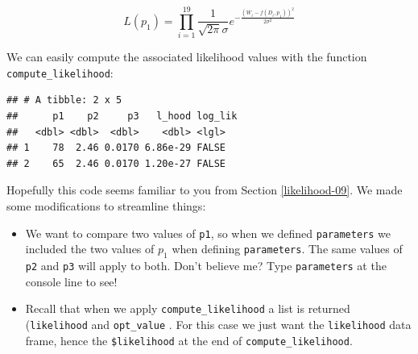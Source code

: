 \documentclass[
]{book}
\newenvironment{Shaded}{\begin{snugshade}}{\end{snugshade}}
\newcommand{\AttributeTok}[1]{\textcolor[rgb]{0.77,0.63,0.00}{#1}}
\newcommand{\CommentTok}[1]{\textcolor[rgb]{0.56,0.35,0.01}{\textit{#1}}}
\newcommand{\DecValTok}[1]{\textcolor[rgb]{0.00,0.00,0.81}{#1}}
\newcommand{\FloatTok}[1]{\textcolor[rgb]{0.00,0.00,0.81}{#1}}
\newcommand{\FunctionTok}[1]{\textcolor[rgb]{0.00,0.00,0.00}{#1}}
\newcommand{\NormalTok}[1]{#1}
\newcommand{\OtherTok}[1]{\textcolor[rgb]{0.56,0.35,0.01}{#1}}
\newcommand{\SpecialCharTok}[1]{\textcolor[rgb]{0.00,0.00,0.00}{#1}}
\providecommand{\tightlist}{%
  \setlength{\itemsep}{0pt}\setlength{\parskip}{0pt}}
\theoremstyle{definition}
\theoremstyle{definition}
\theoremstyle{definition}
\theoremstyle{remark}
\begin{document}
\begin{equation}
L(p_{1}) = \prod_{i=1}^{19} \frac{1}{\sqrt{2 \pi} \sigma} e^{-\frac{(W_{i}-f(D_{i},p_{1}))^{2}}{2 \sigma^{2}}}
\end{equation}

We can easily compute the associated likelihood values with the function \texttt{compute\_likelihood}:

\begin{Shaded}
\end{Shaded}

\begin{verbatim}
## # A tibble: 2 x 5
##      p1    p2     p3   l_hood log_lik
##   <dbl> <dbl>  <dbl>    <dbl> <lgl>  
## 1    78  2.46 0.0170 6.86e-29 FALSE  
## 2    65  2.46 0.0170 1.20e-27 FALSE
\end{verbatim}

Hopefully this code seems familiar to you from Section \ref{likelihood-09}. We made some modifications to streamline things:

\begin{itemize}
\tightlist
\item
  We want to compare two values of \texttt{p1}, so when we defined \texttt{parameters} we included the two values of \(p_{1}\) when defining \texttt{parameters}. The same values of \texttt{p2} and \texttt{p3} will apply to both. Don't believe me? Type \texttt{parameters} at the console line to see!
\item
  Recall that when we apply \texttt{compute\_likelihood} a list is returned (\texttt{likelihood} and \texttt{opt\_value} . For this case we just want the \texttt{likelihood} data frame, hence the \texttt{\$likelihood} at the end of \texttt{compute\_likelihood}.
\end{itemize}
\end{document}
